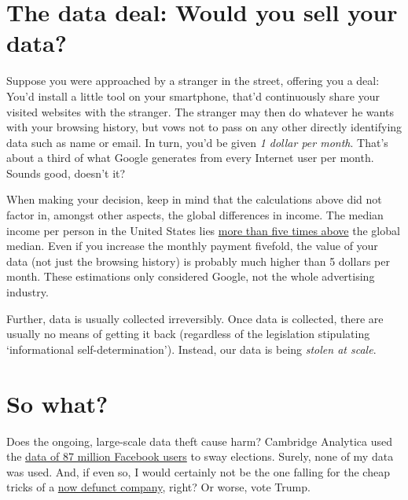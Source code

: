 \documentclass[
]{book}
\begin{document}
\hypertarget{the-data-deal-would-you-sell-your-data}{%
\section{\texorpdfstring{The data deal\textbf{: }Would you sell your data?}{The data deal: Would you sell your data?}}\label{the-data-deal-would-you-sell-your-data}}

Suppose you were approached by a stranger in the street, offering you a deal: You'd install a little tool on your smartphone, that'd continuously share your visited websites with the stranger. The stranger may then do whatever he wants with your browsing history, but vows not to pass on any other directly identifying data such as name or email. In turn, you'd be given \emph{1 dollar per month}. That's about a third of what Google generates from every Internet user per month. Sounds good, doesn't it?

When making your decision, keep in mind that the calculations above did not factor in, amongst other aspects, the global differences in income. The median income per person in the United States lies \href{https://news.gallup.com/poll/166211/worldwide-median-household-income-000.aspx}{more than five times above} the global median. Even if you increase the monthly payment fivefold, the value of your data (not just the browsing history) is probably much higher than 5 dollars per month. These estimations only considered Google, not the whole advertising industry.

Further, data is usually collected irreversibly. Once data is collected, there are usually no means of getting it back (regardless of the legislation stipulating `informational self-determination'). Instead, our data is being \emph{stolen at scale}.

\hypertarget{so-what}{%
\section{So what?}\label{so-what}}

Does the ongoing, large-scale data theft cause harm? Cambridge Analytica used the \href{https://about.fb.com/news/2018/04/restricting-data-access/}{data of 87 million Facebook users} to sway elections. Surely, none of my data was used. And, if even so, I would certainly not be the one falling for the cheap tricks of a \href{https://www.theguardian.com/uk-news/2018/may/02/cambridge-analytica-closing-down-after-facebook-row-reports-say}{now defunct company}, right? Or worse, vote Trump.
\end{document}
